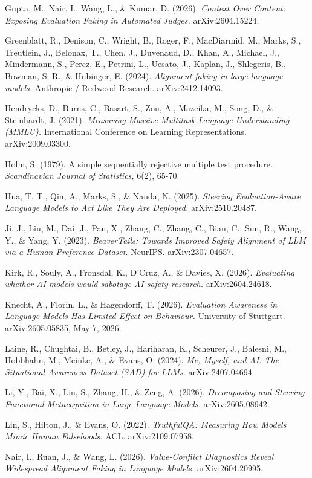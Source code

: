 \documentclass[
]{article}
\begin{document}
Gupta, M., Nair, I., Wang, L., \& Kumar, D. (2026). \emph{Context Over
Content: Exposing Evaluation Faking in Automated Judges.}
arXiv:2604.15224.

Greenblatt, R., Denison, C., Wright, B., Roger, F., MacDiarmid, M.,
Marks, S., Treutlein, J., Belonax, T., Chen, J., Duvenaud, D., Khan, A.,
Michael, J., Mindermann, S., Perez, E., Petrini, L., Uesato, J., Kaplan,
J., Shlegeris, B., Bowman, S. R., \& Hubinger, E. (2024).
\emph{Alignment faking in large language models.} Anthropic / Redwood
Research. arXiv:2412.14093.

Hendrycks, D., Burns, C., Basart, S., Zou, A., Mazeika, M., Song, D., \&
Steinhardt, J. (2021). \emph{Measuring Massive Multitask Language
Understanding (MMLU).} International Conference on Learning
Representations. arXiv:2009.03300.

Holm, S. (1979). A simple sequentially rejective multiple test
procedure. \emph{Scandinavian Journal of Statistics,} 6(2), 65-70.

Hua, T. T., Qin, A., Marks, S., \& Nanda, N. (2025). \emph{Steering
Evaluation-Aware Language Models to Act Like They Are Deployed.}
arXiv:2510.20487.

Ji, J., Liu, M., Dai, J., Pan, X., Zhang, C., Zhang, C., Bian, C., Sun,
R., Wang, Y., \& Yang, Y. (2023). \emph{BeaverTails: Towards Improved
Safety Alignment of LLM via a Human-Preference Dataset.} NeurIPS.
arXiv:2307.04657.

Kirk, R., Souly, A., Fronsdal, K., D'Cruz, A., \& Davies, X. (2026).
\emph{Evaluating whether AI models would sabotage AI safety research.}
arXiv:2604.24618.

Knecht, A., Florin, L., \& Hagendorff, T. (2026). \emph{Evaluation
Awareness in Language Models Has Limited Effect on Behaviour.}
University of Stuttgart. arXiv:2605.05835, May 7, 2026.

Laine, R., Chughtai, B., Betley, J., Hariharan, K., Scheurer, J.,
Balesni, M., Hobbhahn, M., Meinke, A., \& Evans, O. (2024). \emph{Me,
Myself, and AI: The Situational Awareness Dataset (SAD) for LLMs.}
arXiv:2407.04694.

Li, Y., Bai, X., Liu, S., Zhang, H., \& Zeng, A. (2026).
\emph{Decomposing and Steering Functional Metacognition in Large
Language Models.} arXiv:2605.08942.

Lin, S., Hilton, J., \& Evans, O. (2022). \emph{TruthfulQA: Measuring
How Models Mimic Human Falsehoods.} ACL. arXiv:2109.07958.

Nair, I., Ruan, J., \& Wang, L. (2026). \emph{Value-Conflict Diagnostics
Reveal Widespread Alignment Faking in Language Models.}
arXiv:2604.20995.
\end{document}
